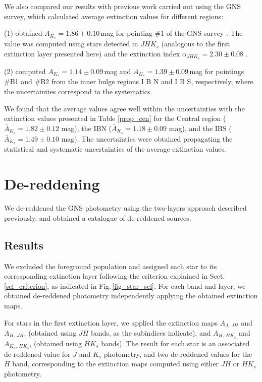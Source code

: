 \documentclass{aa}
\begin{document}
We also compared our results with previous work carried out using the GNS survey, which calculated average extinction values for different regions: 



(1) \citet{Nogueras-Lara:2018aa} obtained $A_{K_s}=1.86\pm0.10$\,mag for pointing \#1 of the GNS survey \citep[see Fig. 2 of ][]{Nogueras-Lara:2019aa}. The value was computed using stars detected in $JHK_s$ (analogous to the first extinction layer presented here) and the extinction index $\alpha_{JHK_s} = 2.30\pm0.08$ \citep{Nogueras-Lara:2018aa}. 

(2) \citet{Nogueras-Lara:2018ab} computed $A_{K_s}=1.14\pm0.09$\,mag and $A_{K_s}=1.39\pm0.09$\,mag for pointings \#B1 and \#B2 from the inner bulge regions I B N and I B S, respectively, where the uncertainties correspond to the systematics. 


We found that the average values agree well within the uncertainties with the extinction values presented in Table \ref{prop_cen} for the Central region ($\bar{A}_{K_s}=1.82\pm0.12$ mag), the IBN ($\bar{A}_{K_s}=1.18\pm0.09$ mag), and the IBS ($\bar{A}_{K_s}=1.49\pm0.10$ mag). The uncertainties were obtained propagating the statistical and systematic uncertainties of the average extinction values.    
    
 \section{De-reddening}
 

We de-reddened the GNS photometry using the two-layers approach described previously, and obtained a catalogue of de-reddened sources.



\subsection{Results}

We excluded the foreground population and assigned each star to its corresponding extinction layer following the criterion explained in Sect. \ref{sel_criterion}, as indicated in Fig.\,\ref{fig_star_sel}. For each band and layer, we obtained de-reddened photometry independently applying the obtained extinction maps.



For stars in the first extinction layer, we applied the extinction maps $A_{J,\ JH}$ and $A_{H,\ JH}$, (obtained using $JH$ bands, as the subindices indicate), and $A_{H,\ HK_s}$ and $A_{K_s,\ HK_s}$, (obtained using $HK_s$ bands). The result for each star is an associated de-reddened value for $J$ and $K_s$ photometry, and two de-reddened values for the $H$ band, corresponding to the extinction maps computed using either $JH$ or $HK_s$ photometry. 
\end{document}
